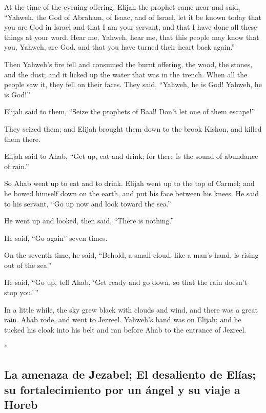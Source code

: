 \begin{paracol}{2}
\begin{otherlanguage}{english}
 At the time of the evening offering, Elijah the prophet
came near and said, ``Yahweh, the God of Abraham, of Isaac, and of
Israel, let it be known today that you are God in Israel and that I am
your servant, and that I have done all these things at your word.
 Hear me, Yahweh, hear me, that this people may know that
you, Yahweh, are God, and that you have turned their heart back again.''

 Then Yahweh's fire fell and consumed the burnt offering,
the wood, the stones, and the dust; and it licked up the water that was
in the trench.  When all the people saw it, they fell on
their faces. They said, ``Yahweh, he is God! Yahweh, he is God!''

 Elijah said to them, ``Seize the prophets of Baal! Don't
let one of them escape!''

They seized them; and Elijah brought them down to the brook Kishon, and
killed them there.

 Elijah said to Ahab, ``Get up, eat and drink; for there
is the sound of abundance of rain.''

 So Ahab went up to eat and to drink. Elijah went up to
the top of Carmel; and he bowed himself down on the earth, and put his
face between his knees.  He said to his servant, ``Go up
now and look toward the sea.''

He went up and looked, then said, ``There is nothing.''

He said, ``Go again'' seven times.

 On the seventh time, he said, ``Behold, a small cloud,
like a man's hand, is rising out of the sea.''

He said, ``Go up, tell Ahab, `Get ready and go down, so that the rain
doesn't stop you.'\,''

 In a little while, the sky grew black with clouds and
wind, and there was a great rain. Ahab rode, and went to Jezreel.
 Yahweh's hand was on Elijah; and he tucked his cloak
into his belt and ran before Ahab to the entrance of Jezreel.

\end{otherlanguage}

\switchcolumn[0]*

\hypertarget{la-amenaza-de-jezabel-el-desaliento-de-eluxedas-su-fortalecimiento-por-un-uxe1ngel-y-su-viaje-a-horeb}{%
\subsection{La amenaza de Jezabel; El desaliento de Elías; su
fortalecimiento por un ángel y su viaje a
Horeb}\label{la-amenaza-de-jezabel-el-desaliento-de-eluxedas-su-fortalecimiento-por-un-uxe1ngel-y-su-viaje-a-horeb}}


\end{paracol}
